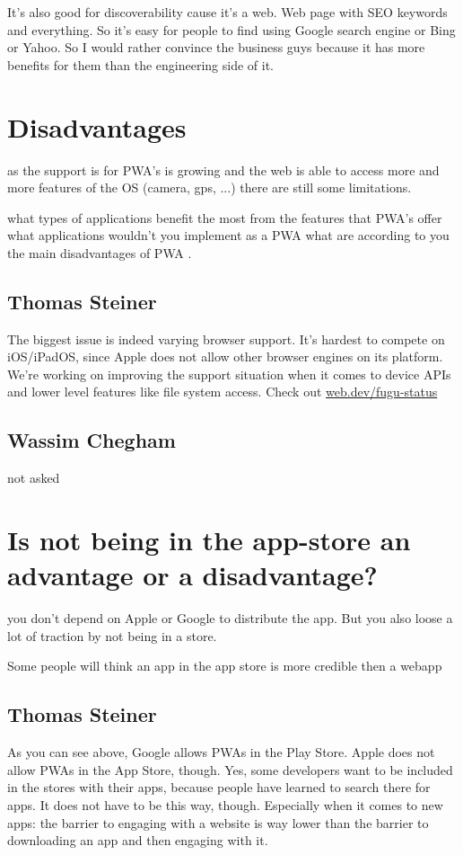 			It's also good for discoverability cause it's a web. Web page with SEO keywords and everything. So it's easy for people to find using Google search engine or Bing or Yahoo. So I would rather convince the business guys because it has more benefits for them than the engineering side of it.
			
	\section{Disadvantages}
	
		as the support is for PWA's is growing and the web is able to access more and more features of the OS (camera, gps, ...) there are still some limitations. 
		
		what types of applications benefit the most from the features that PWA's offer what applications wouldn't you implement as a PWA what are according to you the main disadvantages of PWA .
		
		\subsection{Thomas Steiner}
		
			The biggest issue is indeed varying browser support. It’s hardest to compete on iOS/iPadOS, since Apple does not allow other browser engines on its platform. We’re working on improving the support situation when it comes to device APIs and lower level features like file system access. Check out	\href{https://web.dev/fugu-status/}{web.dev/fugu-status}

		\subsection{Wassim Chegham}
			not asked
			


	\section{Is not being in the app-store an advantage or a disadvantage?}
		
		you don't depend on Apple or Google to distribute the app. But you also loose a lot of traction by not being in a store.
		
		Some people will think an app in the app store is more credible then a webapp
			
		\subsection{Thomas Steiner}
			As you can see above, Google allows PWAs in the Play Store. Apple does not allow PWAs in the App Store, though. Yes, some developers want to be included in the stores with their apps, because people have learned to search there for apps. It does not have to be this way, though. Especially when it comes to new apps: the barrier to engaging with a website is way lower than the barrier to downloading an app and then engaging with it.
			
